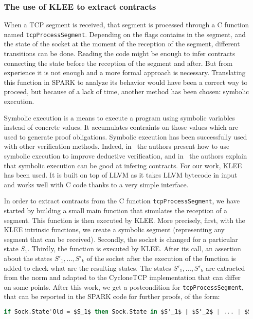\documentclass[runningheads]{llncs}
\begin{document}
\subsubsection{The use of KLEE to extract contracts}

    When a TCP segment is received, that segment is processed through a C function named \lstinline{tcpProcessSegment}.
    Depending on the flags contains in the segment, and the state of the socket at the moment of the reception of the segment, different
    transitions can be done. Reading the code might be enough to infer contracts connecting the state before the reception of the segment
    and after. But from experience it is not enough and a more formal approach is necessary. Translating this function in SPARK to analyze
    its behavior would have been a correct way to proceed, but because of a lack of time, another method has been chosen: symbolic execution.

    Symbolic execution is a means to execute a program using symbolic variables instead of concrete values. It accumulates contraints
    on those values which are used to generate proof obligations. Symbolic execution has been successfully used with other verification
    methods. Indeed, in~\cite{vanoverberghe2008using} the authors present how to use symbolic execution to improve deductive verification,
    and in~\cite{kassios2012comparing} the authors explain that symbolic execution can be good at infering contracts.
    For our work, KLEE has been used. It is built on top of LLVM as it takes LLVM bytecode in input
    and works well with C code thanks to a very simple interface.

    In order to extract contracts from the C function \lstinline{tcpProcessSegment}, we have started by building a small main function that
    simulates the reception of a segment. This function is then executed by KLEE. More precisely, first, with the KLEE intrinsic functions, we
    create a symbolic segment (representing any segment that can be received). Secondly, the socket is changed for a particular state $S_1$. Thirdly, the
    function is executed by KLEE. After its call, an assertion about the states $S'_1, \dots, S'_k$ of the socket after the execution
    of the function is added to check what are the resulting states. The states $S'_1, \dots, S'_k$ are extracted from the norm and adapted to the CycloneTCP
    implementation that can differ on some points.
    After this work, we get a postcondition for \lstinline{tcpProcessSegment}, that can be reported in the SPARK code for further proofs, of the form:
    \begin{lstlisting}[language=Ada,mathescape=true]
  if Sock.State'Old = $S_1$ then Sock.State in $S'_1$ | $S'_2$ | ... | $S'_k$
    \end{lstlisting}
\end{document}
